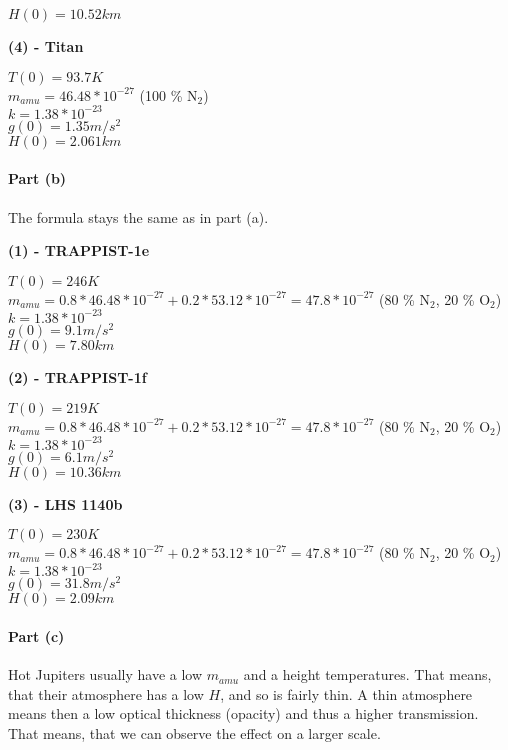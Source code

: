 \documentclass[12pt,a4paper]{article}
\begin{document}
$H(0) = 10.52 km$

\textbf{(4) - Titan}

$T(0) = 93.7 K$ \\
$m_{amu} = 46.48 * 10^{-27}$ (100 \% N${}_2$) \\
$k = 1.38 * 10^{-23}$ \\
$g(0) = 1.35 m/s^2$ \\

$H(0) = 2.061 km$

\paragraph{Part (b)}

The formula stays the same as in part (a).

\textbf{(1) - TRAPPIST-1e}

$T(0) = 246 K$ \\
$m_{amu} = 0.8 * 46.48 * 10^{-27} + 0.2 * 53.12 * 10^{-27} = 47.8 * 10^{-27}$ (80 \% N${}_2$, 20 \% O${}_2$) \\
$k = 1.38 * 10^{-23}$ \\
$g(0) = 9.1 m/s^2$ \\

$H(0) = 7.80 km$

\textbf{(2) - TRAPPIST-1f}

$T(0) = 219 K$ \\
$m_{amu} = 0.8 * 46.48 * 10^{-27} + 0.2 * 53.12 * 10^{-27} = 47.8 * 10^{-27}$ (80 \% N${}_2$, 20 \% O${}_2$) \\
$k = 1.38 * 10^{-23}$ \\
$g(0) = 6.1 m/s^2$ \\

$H(0) = 10.36 km$

\textbf{(3) - LHS 1140b}

$T(0) = 230 K$ \\
$m_{amu} = 0.8 * 46.48 * 10^{-27} + 0.2 * 53.12 * 10^{-27} = 47.8 * 10^{-27}$ (80 \% N${}_2$, 20 \% O${}_2$) \\
$k = 1.38 * 10^{-23}$ \\
$g(0) = 31.8 m/s^2$ \\

$H(0) = 2.09 km$

\paragraph{Part (c)}

Hot Jupiters usually have a low $m_{amu}$ and a height temperatures. That means, that their atmosphere has a low $H$, and so is fairly thin. A thin atmosphere means then a low optical thickness (opacity) and thus a higher transmission. That means, that we can observe the effect on a larger scale.
\end{document}
